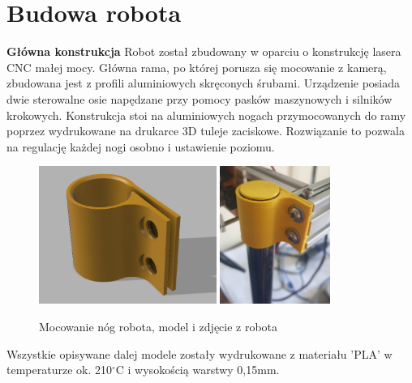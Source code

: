 \section{Budowa robota}

\textbf{Główna konstrukcja} \newline
Robot został zbudowany w oparciu o konstrukcję lasera CNC małej mocy. Główna rama, po której porusza się mocowanie z kamerą, zbudowana jest z profili aluminiowych skręconych śrubami.
Urządzenie posiada dwie sterowalne osie napędzane przy pomocy pasków maszynowych i silników krokowych. 
Konstrukcja stoi na aluminiowych nogach przymocowanych do ramy poprzez wydrukowane na drukarce 3D tuleje zaciskowe. 
Rozwiązanie to pozwala na regulację każdej nogi osobno i ustawienie poziomu. 
\begin{figure}[H]
	\centering
	\includegraphics[height=4.5cm]{pages/dodatekARobot/img/model3DMocowaniaNog.png}
    \includegraphics[height=4.5cm]{pages/dodatekARobot/img/mocowanieNogi.jpg}
	\caption{Mocowanie nóg robota, model i zdjęcie z robota}
	\label{rys:model3DMocowanieNog}
\end{figure}
Wszystkie opisywane dalej modele zostały wydrukowane z materiału 'PLA' w temperaturze ok. 210$^\circ$C i wysokością warstwy 0,15mm.

